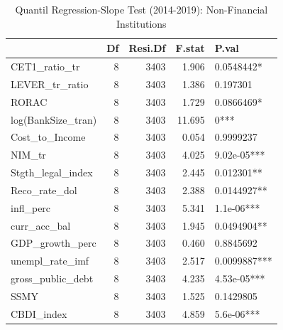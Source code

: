 \begin{table}[ht]
\centering
\caption{Quantil Regression-Slope Test (2014-2019): Non-Financial Institutions} 
\begingroup\small
\begin{tabular}{lrrrl}
  \toprule
 & Df & Resi.Df & F.stat & P.val \\ 
  \midrule
CET1\_ratio\_tr & 8 & 3403 & 1.906 & 0.0548442* \\ 
  LEVER\_tr\_ratio & 8 & 3403 & 1.386 & 0.197301 \\ 
  RORAC & 8 & 3403 & 1.729 & 0.0866469* \\ 
  log(BankSize\_tran) & 8 & 3403 & 11.695 & 0*** \\ 
  Cost\_to\_Income & 8 & 3403 & 0.054 & 0.9999237 \\ 
  NIM\_tr & 8 & 3403 & 4.025 & 9.02e-05*** \\ 
  Stgth\_legal\_index & 8 & 3403 & 2.445 & 0.012301** \\ 
  Reco\_rate\_dol & 8 & 3403 & 2.388 & 0.0144927** \\ 
  infl\_perc & 8 & 3403 & 5.341 & 1.1e-06*** \\ 
  curr\_acc\_bal & 8 & 3403 & 1.945 & 0.0494904** \\ 
  GDP\_growth\_perc & 8 & 3403 & 0.460 & 0.8845692 \\ 
  unempl\_rate\_imf & 8 & 3403 & 2.517 & 0.0099887*** \\ 
  gross\_public\_debt & 8 & 3403 & 4.235 & 4.53e-05*** \\ 
  SSMY & 8 & 3403 & 1.525 & 0.1429805 \\ 
  CBDI\_index & 8 & 3403 & 4.859 & 5.6e-06*** \\ 
   \bottomrule
\end{tabular}
\endgroup
\end{table}
